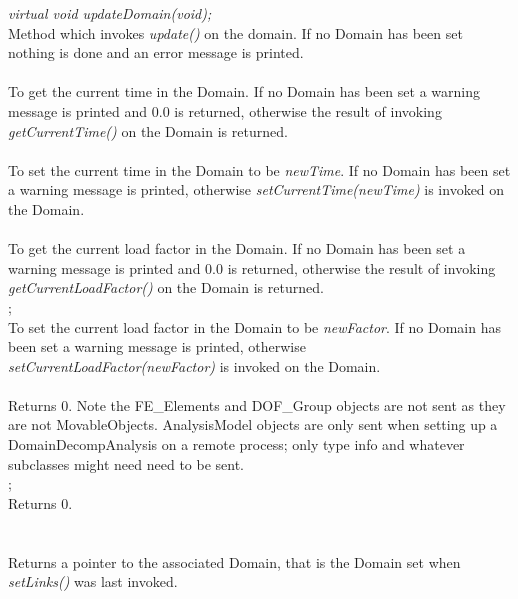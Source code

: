 {\em virtual void updateDomain(void);}\\
Method which invokes {\em update()} on the domain. If no Domain has
been set nothing is done and an error message is printed. \\ 

 \\
To get the current time in the Domain. If no Domain has been set a
warning message is printed and $0.0$ is returned, otherwise the result
of invoking {\em getCurrentTime()} on the Domain is returned. \\

\\
To set the current time in the Domain to be {\em newTime}. If no
Domain has been set a warning message is printed, otherwise 
{\em setCurrentTime(newTime)} is invoked on the Domain. \\

\\
To get the current load factor in the Domain. If no Domain has been set a
warning message is printed and $0.0$ is returned, otherwise the result
of invoking {\em getCurrentLoadFactor()} on the Domain is returned. \\

;\\
To set the current load factor in the Domain to be {\em newFactor}. If no
Domain has been set a warning message is printed, otherwise 
{\em setCurrentLoadFactor(newFactor)} is invoked on the Domain. \\

\\ 
Returns $0$. Note the FE\_Elements and DOF\_Group objects are not sent
as they are not MovableObjects. AnalysisModel objects are only sent
when setting up a DomainDecompAnalysis on a remote process; only type
info and whatever subclasses might need need to be sent.\\

\indent{};\\
Returns $0$.  \\

  \\
 \\
Returns a pointer to the associated Domain, that is the Domain
set when {\em setLinks()} was last invoked. 


